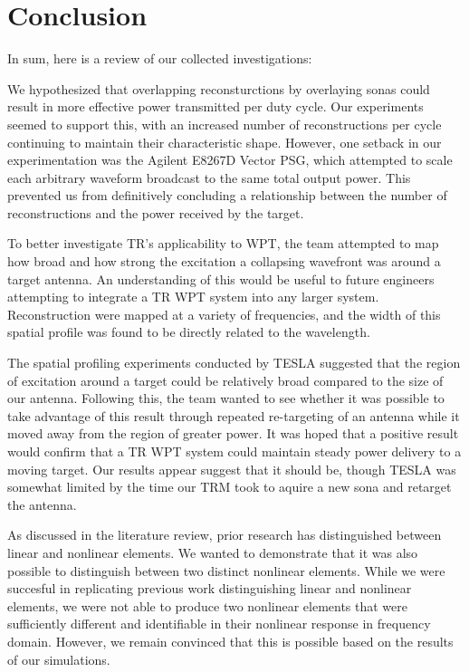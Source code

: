 \chapter{Conclusion}

\label{ch:conclusion}

In sum, here is a review of our collected investigations:

We hypothesized that overlapping reconsturctions by overlaying sonas could result in more effective power transmitted per duty cycle. Our experiments seemed to support this, with an increased number of reconstructions per cycle continuing to maintain their characteristic shape. However, one setback in our experimentation was the Agilent E8267D Vector PSG, which attempted to scale each arbitrary waveform  broadcast to the same total output power. This prevented us from definitively concluding a relationship between the number of reconstructions and the power received by the target.

To better investigate TR's applicability to WPT, the team attempted to map how broad and how strong the excitation a collapsing wavefront was around a target antenna. An understanding of this would be useful to future engineers attempting to integrate a TR WPT system into any larger system. Reconstruction were mapped at a variety of frequencies, and the width of this spatial profile was found to be directly related to the wavelength.

The spatial profiling experiments conducted by TESLA suggested that the region of excitation around a target could be relatively broad compared to the size of our antenna. Following this, the team wanted to see whether it was possible to take advantage of this result through repeated re-targeting of an antenna while it moved away from the region of greater power. It was hoped that a positive result  would confirm that a TR WPT system could maintain steady power delivery to a moving target. Our results appear suggest that it should be, though TESLA was somewhat limited by the time our TRM took to aquire a new sona and retarget the antenna.

As discussed in the literature review, prior research has distinguished between linear and nonlinear elements. We wanted to demonstrate that it was also possible to distinguish between two distinct nonlinear elements. While we were succesful in replicating previous work distinguishing linear and nonlinear elements, we were not able to produce two nonlinear elements that were sufficiently different and identifiable in their nonlinear response in frequency domain. However, we remain convinced that this is possible based on the results of our simulations.

